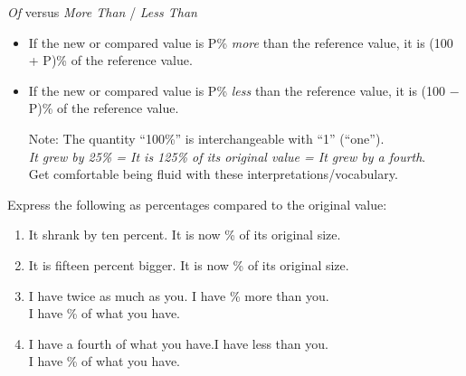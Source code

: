 \documentclass[12pt]{article}
\begin{document}
\emph{Of} versus \emph{More Than} / \emph{Less Than}
\begin{itemize}
\item If the new or compared value is P\% \emph{more} than the reference value, it is (100 + P)\% of the reference value.
\item If the new or compared value is P\% \emph{less} than the reference value, it is (100 − P)\% of the reference value.
\item[Note:] The quantity ``100\%'' is interchangeable with ``1'' (``one''). \\
\emph{It grew by 25\% = It is 125\% of its original value = It grew by a fourth}. \\
Get comfortable being fluid with these interpretations/vocabulary.
\end{itemize}
\vspace{0.5in}

Express the following as percentages compared to the original value:
\begin{enumerate}
\item It shrank by ten percent. It is now \underline{\hspace{0.5in}}\% of its original size.
\item It is fifteen percent bigger. It is now \underline{\hspace{0.5in}}\% of its original size.
\item I have twice as much as you. I have \underline{\hspace{0.5in}}\% more than you. \\
I have \underline{\hspace{0.5in}}\% of what you have.
\item I have a fourth of what you have.I have \underline{\hspace{0.5in}} less than you. \\
I have \underline{\hspace{0.5in}}\% of what you have.
\end{enumerate}
\end{document}
